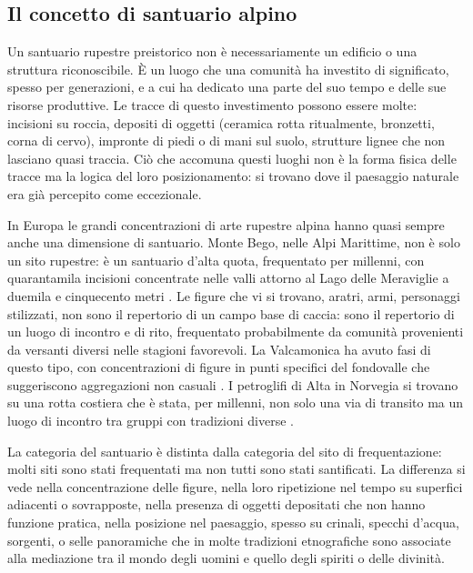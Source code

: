 \subsection*{Il concetto di santuario alpino}

Un santuario rupestre preistorico non è necessariamente un edificio o una struttura riconoscibile. È un luogo che una comunità ha investito di significato, spesso per generazioni, e a cui ha dedicato una parte del suo tempo e delle sue risorse produttive. Le tracce di questo investimento possono essere molte: incisioni su roccia, depositi di oggetti (ceramica rotta ritualmente, bronzetti, corna di cervo), impronte di piedi o di mani sul suolo, strutture lignee che non lasciano quasi traccia. Ciò che accomuna questi luoghi non è la forma fisica delle tracce ma la logica del loro posizionamento: si trovano dove il paesaggio naturale era già percepito come eccezionale.

In Europa le grandi concentrazioni di arte rupestre alpina hanno quasi sempre anche una dimensione di santuario. Monte Bego, nelle Alpi Marittime, non è solo un sito rupestre: è un santuario d'alta quota, frequentato per millenni, con quarantamila incisioni concentrate nelle valli attorno al Lago delle Meraviglie a duemila e cinquecento metri \citep{lumley1995}. Le figure che vi si trovano, aratri, armi, personaggi stilizzati, non sono il repertorio di un campo base di caccia: sono il repertorio di un luogo di incontro e di rito, frequentato probabilmente da comunità provenienti da versanti diversi nelle stagioni favorevoli. La Valcamonica ha avuto fasi di questo tipo, con concentrazioni di figure in punti specifici del fondovalle che suggeriscono aggregazioni non casuali \citep{demarinis2012}. I petroglifi di Alta in Norvegia si trovano su una rotta costiera che è stata, per millenni, non solo una via di transito ma un luogo di incontro tra gruppi con tradizioni diverse \citep{helskog1988}.

La categoria del santuario è distinta dalla categoria del sito di frequentazione: molti siti sono stati frequentati ma non tutti sono stati santificati. La differenza si vede nella concentrazione delle figure, nella loro ripetizione nel tempo su superfici adiacenti o sovrapposte, nella presenza di oggetti depositati che non hanno funzione pratica, nella posizione nel paesaggio, spesso su crinali, specchi d'acqua, sorgenti, o selle panoramiche che in molte tradizioni etnografiche sono associate alla mediazione tra il mondo degli uomini e quello degli spiriti o delle divinità.

